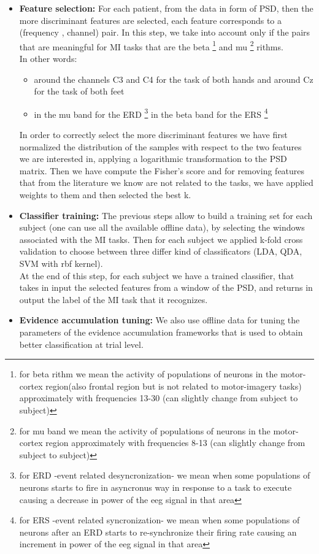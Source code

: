 \begin{itemize}
\item \textbf{Feature selection:}  For each patient, from the data in form of PSD, then the more discriminant features are selected, each feature corresponds to a (frequency , channel) pair. In this step, we take into account only if the pairs that are meaningful for MI tasks that are the beta
\footnote{for beta rithm we mean the activity of populations of neurons in the motor-cortex region(also frontal region but is not related to motor-imagery tasks) approximately with frequencies 13-30 (can slightly change from subject to subject)}
 and mu
 \footnote{for mu band we mean the activity of populations of neurons in the motor-cortex region approximately with frequencies 8-13 (can slightly change from subject to subject)}
rithms.\\
In other words:
\begin{itemize}
\item around the channels C3 and C4 for the task of both hands and around Cz for the task of both feet
\item  in the mu band for the ERD
 \footnote{for ERD -event related desyncronization- we mean when some populations of neurons starts to fire in asyncronus way in response to a task to execute causing a decrease in power of the eeg signal in that area}
 in the beta band for the ERS 
 \footnote{for ERS -event related syncronization- we mean when some populations of neurons after an ERD starts to re-synchronize their firing rate causing an increment in power of the eeg signal in that area}
\end{itemize}
In order to correctly select the more discriminant features we have first normalized the distribution of the samples with respect to the two features we are interested in, applying a logarithmic transformation to the PSD matrix.
Then we have compute the Fisher's score and for removing features that from the literature we know are not related to the tasks, we have applied weights to them and then selected the best k.
\item \textbf{Classifier training:} The previous steps allow to build a training set for each subject (one can use all the available offline data), by selecting the windows associated with the MI tasks. Then for each subject we applied k-fold cross validation to choose between three differ kind of classificators (LDA, QDA, SVM with rbf kernel).\\
At the end of this step, for each subject we have a trained classifier, that takes in input the selected features from a window of the PSD, and returns in output the label of the MI task that it recognizes. \\
\item \textbf{Evidence accumulation tuning:} We also use offline data for tuning the parameters of the evidence accumulation frameworks that is used to obtain better classification at trial level. 
\end{itemize}

